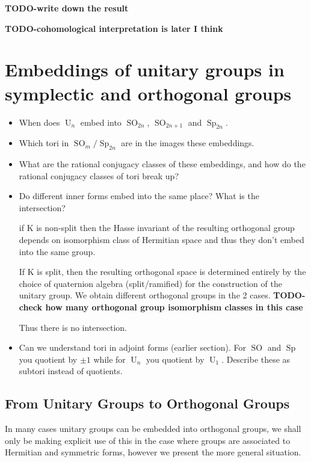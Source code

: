 \documentclass{article}
\theoremstyle{plain}
\theoremstyle{definition}
\numberwithin{equation}{section}
\DeclareMathOperator{\Sp}{Sp}
\DeclareMathOperator{\SO}{SO}
\DeclareMathOperator{\U}{U}
\newcommand{\TODO}[1]{\textbf{TODO-#1}}
\begin{document}
\TODO{write down the result}

\TODO{cohomological interpretation is later I think}

\section{Embeddings of unitary groups in symplectic and orthogonal groups}

\begin{itemize}
\item When does $\U_n$ embed into $\SO_{2n}$, $\SO_{2n+1}$ and $\Sp_{2n}$.
\item Which tori in $\SO_m / \Sp_{2n}$ are in the images these embeddings.
\item What are the rational conjugacy classes of these embeddings, and how do the rational conjugacy classes of tori break up?
\item Do different inner forms embed into the same place?  What is the intersection?

if K is non-split then the Hasse invariant of the resulting orthogonal group depends on isomorphism class of Hermitian space and thus they don't embed into the same group.

If K is split, then the resulting orthogonal space is determined entirely by the choice of quaternion algebra (split/ramified) for the construction of the unitary group. We obtain different orthogonal groups in the 2 cases.
\TODO{check how many orthogonal group isomorphism classes in this case}

Thus there is no intersection.

\item Can we understand tori in adjoint forms (earlier section).  For $\SO$ and $\Sp$ you quotient by $\pm 1$ while for $\U_n$ you quotient by $\U_1$.  Describe these as subtori instead of quotients.
\end{itemize}

\subsection{From Unitary Groups to Orthogonal Groups}

In many cases unitary groups can be embedded into orthogonal groups, we shall only be making explicit use of this in the case where groups are associated to Hermitian and symmetric forms, however we present the more general situation.
\end{document}
